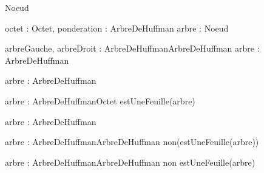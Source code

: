 \begin{algorithme}


\begin{enregistrement}{Noeud}
\end{enregistrement}



    {octet : Octet, ponderation : \naturel}{ArbreDeHuffman}
    {}{arbre : Noeud}
{
}

    {arbreGauche, arbreDroit : ArbreDeHuffman}{ArbreDeHuffman}
    {}{arbre : ArbreDeHuffman}
{
}

    {arbre : ArbreDeHuffman}{\naturel}
    {}{}
{
}

    {arbre : ArbreDeHuffman}{Octet}
    {estUneFeuille(arbre)}{}
{
}

    {arbre : ArbreDeHuffman}{\booleen}
    {}{}
{
}

    {arbre : ArbreDeHuffman}{ArbreDeHuffman}
    {non(estUneFeuille(arbre))}{}
{
}

    {arbre : ArbreDeHuffman}{ArbreDeHuffman}
    {non estUneFeuille(arbre)}{}
{
}

\end{algorithme}
